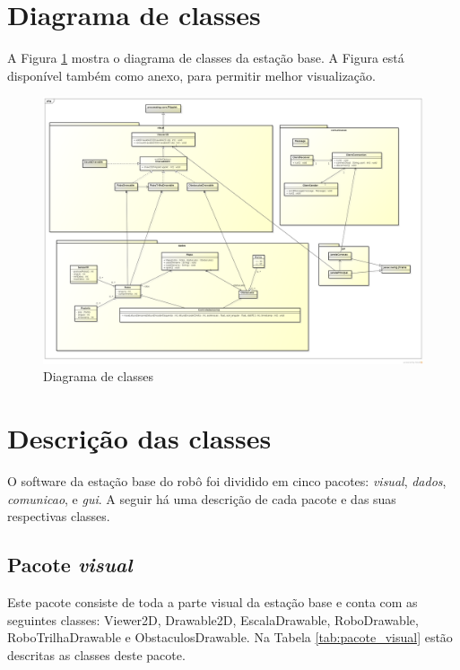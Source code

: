 \section{Diagrama de classes}

A Figura \ref{fig:diagrama_classes} mostra o diagrama de classes da estação base. A Figura está disponível também como anexo, para permitir melhor visualização.

\begin{figure}[h]
  \centering
  \includegraphics[width=\textwidth]{./figuras/diagrama_classes.png}
  \caption{Diagrama de classes}
  \label{fig:diagrama_classes}
\end{figure}

\section{Descrição das classes}
O software da estação base do robô foi dividido em cinco pacotes:  \textit{visual}, \textit{dados}, \textit{comunicao}, e \textit{gui}. A seguir há uma descrição de cada pacote e das suas respectivas classes.


\subsection{Pacote \textit{visual}}

Este pacote consiste de toda a parte visual da estação base e conta com as seguintes classes: Viewer2D, Drawable2D, EscalaDrawable, RoboDrawable, RoboTrilhaDrawable e ObstaculosDrawable. Na Tabela \ref{tab:pacote_visual} estão descritas as classes deste pacote.


